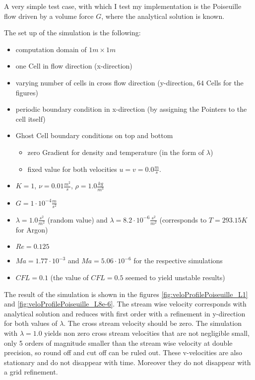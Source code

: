 \documentclass[
	pdftex,             %
	12pt,				%
	a4paper,		   	%
	english,				%
	oneside,			%
]{article}
\begin{document}
A very simple test case, with which I test my implementation is the Poiseuille flow driven by a volume force $G$, where the analytical solution is known.

The set up of the simulation is the following:

\begin{itemize}
\item computation domain of $1m \times 1m$
\item one Cell in flow direction (x-direction)
\item varying number of cells in cross flow direction (y-direction, $64$ Cells for the figures)
\item periodic boundary condition in x-direction (by assigning the Pointers to the cell itself)
\item Ghost Cell boundary conditions on top and bottom
	\begin{itemize}
	\item zero Gradient for density and temperature (in the form of $\lambda$)
	\item fixed value for both velocities $u = v = 0.0 \frac{m}{s}$.
	\end{itemize}
\item $K = 1$, $\nu = 0.01 \frac{m^2}{s}$, $\rho = 1.0 \tfrac{kg}{m^3}$
\item $G = 1\cdot 10^{-4} \frac{m}{s^2}$
\item $\lambda = 1.0 \tfrac{s^2}{m^2}$ (random value) and $\lambda = 8.2 \cdot 10^{-6}  \tfrac{s^2}{m^2}$ (corresponds to $T = 293.15 K$ for Argon)
\item $Re = 0.125$
\item $Ma = 1.77 \cdot 10^{-3}$ and $Ma = 5.06 \cdot 10^{-6}$ for the respective simulations
\item $CFL = 0.1$ (the value of $CFL = 0.5$ seemed to yield unstable results)
\end{itemize}

The result of the simulation is shown in the figures \ref{fig:veloProfilePoiseuille_L1} and \ref{fig:veloProfilePoiseuille_L8e-6}. The stream wise velocity corresponds with analytical solution and reduces with first order with a refinement in y-direction for both values of $\lambda$. The cross stream velocity should be zero. The simulation with $\lambda = 1.0$ yields non zero cross stream velocities that are not negligible small, only 5 orders of magnitude smaller than the stream wise velocity at double precision, so round off and cut off can be ruled out. These v-velocities are also stationary and do not disappear with time. Moreover they do not disappear with a grid refinement.
\end{document}
